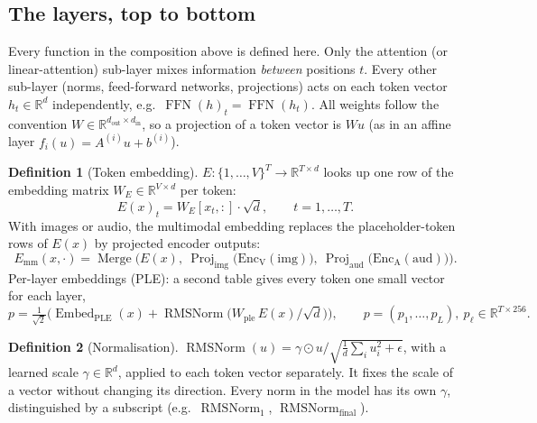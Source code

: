 \documentclass[10pt,a4paper]{article}
\newcommand{\op}[1]{\operatorname{#1}}
\theoremstyle{definition}
\newtheorem{definition}{Definition}[section]
\begin{document}
\subsection{The layers, top to bottom}\label{sec:layers}
Every function in the composition above is defined here. Only the attention (or linear-attention) sub-layer mixes information \emph{between} positions $t$. Every other sub-layer (norms, feed-forward networks, projections) acts on each token vector $h_t\in\mathbb{R}^{d}$ independently, e.g.\ $\op{FFN}(h)_t=\op{FFN}(h_t)$. All weights follow the convention $W\in\mathbb{R}^{d_{\mathrm{out}}\times d_{\mathrm{in}}}$, so a projection of a token vector is $W u$ (as in an affine layer $f_i(u)=A^{(i)}u+b^{(i)}$).
\begin{definition}[Token embedding]\label{def:embed}
$E:\{1,\dots,V\}^{T}\to\mathbb{R}^{T\times d}$ looks up one row of the embedding matrix $W_E\in\mathbb{R}^{V\times d}$ per token:
\begin{equation}
  E(x)_t = W_E[x_t,:]\cdot\sqrt{d},\qquad t=1,\dots,T.
\end{equation}
With images or audio, the multimodal embedding replaces the placeholder-token rows of $E(x)$ by projected encoder outputs:
\begin{equation}
  E_{\mathrm{mm}}(x,\cdot) = \op{Merge}\Big(E(x),\ \op{Proj}_{\mathrm{img}}\big(\op{Enc_V}(\mathrm{img})\big),\ \op{Proj}_{\mathrm{aud}}\big(\op{Enc_A}(\mathrm{aud})\big)\Big).
\end{equation}
Per-layer embeddings (PLE): a second table gives every token one small vector for each layer,
\begin{equation}
  p = \tfrac{1}{\sqrt2}\Big(\op{Embed}_{\mathrm{PLE}}(x) + \op{RMSNorm}\big(W_{\mathrm{ple}}\,E(x)/\sqrt{d}\big)\Big),\qquad p=(p_1,\dots,p_L),\ p_\ell\in\mathbb{R}^{T\times 256}.
\end{equation}
\end{definition}
\begin{definition}[Normalisation]
$\op{RMSNorm}(u)=\gamma\odot u/\sqrt{\tfrac1d\sum_i u_i^2+\epsilon}$, with a learned scale $\gamma\in\mathbb{R}^{d}$, applied to each token vector separately. It fixes the scale of a vector without changing its direction. Every norm in the model has its own $\gamma$, distinguished by a subscript (e.g.\ $\op{RMSNorm}_1$, $\op{RMSNorm}_{\mathrm{final}}$).
\end{definition}
\end{document}
